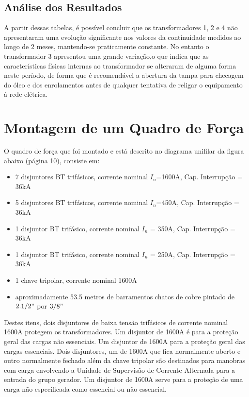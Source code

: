 \subsection{Análise dos Resultados}
\samepage
A partir dessas tabelas, é possível concluir que os transformadores 1, 2 e 4 não apresentaram uma evolução significante nos valores da continuidade medidos ao longo de 2 meses, mantendo-se praticamente constante. No entanto o transformador 3 apresentou uma grande variação,o que indica que as características físicas internas ao transformador se alteraram de alguma forma neste período, de forma que é recomendável a abertura da tampa para checagem do óleo e dos enrolamentos antes de qualquer tentativa de religar o equipamento à rede elétrica.
\\


\section{Montagem de um Quadro de Força}

O quadro de força que foi montado e está descrito no diagrama unifilar da figura abaixo (página 10), consiste em:
\begin{itemize}
\item 7 disjuntores BT trifásicos, corrente nominal $I_n$=1600A, Cap. Interrupção = 36kA
\item 5 disjuntores BT trifásicos, corrente nominal $I_n$=450A, Cap. Interrupção = 36kA
\item 1 disjuntor BT trifásico, corrente nominal $I_n$ = 350A, Cap. Interrupção = 36kA
\item 1 disjuntor BT trifásico, corrente nominal $I_n$ = 250A, Cap. Interrupção = 36kA
\item 1 chave tripolar, corrente nominal 1600A
\item aproximadamente 53.5 metros de barramentos chatos de cobre pintado de $2.1/2"$ por $3/8"$
\end{itemize} 
Destes itens, dois disjuntores de baixa tensão trifásicos de corrente nominal 1600A protegem os transformadores. Um disjuntor de 1600A é para a proteção geral das cargas não essenciais. Um disjuntor de 1600A para a proteção geral das cargas essenciais. Dois disjuntores, um de 1600A que fica normalmente aberto e outro normalmente fechado além da chave tripolar são destinados para manobras com carga envolvendo a Unidade de Supervisão de Corrente Alternada para a entrada do grupo gerador. Um disjuntor de 1600A serve para a proteção de uma carga não especificada como essencial ou não essencial. \\


